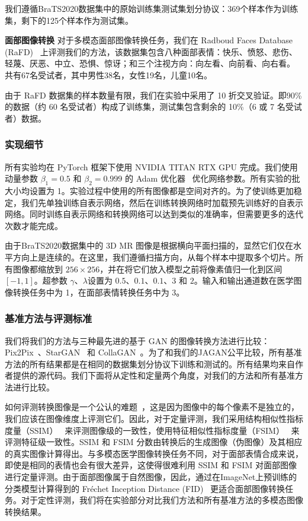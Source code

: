 我们遵循BraTS2020数据集中的原始训练集测试集划分协议：369个样本作为训练集，剩下的125个样本作为测试集。

\textbf{面部图像转换}
对于多模态面部图像转换任务，我们在 Radboud Faces Database (RaFD)~\cite{langner2010presentation} 上评测我们的方法，该数据集包含八种面部表情：快乐、愤怒、悲伤、轻蔑、厌恶、中立、恐惧、惊讶；和三个注视方向：向左看、向前看、向右看。 共有67名受试者，其中男性38名，女性19名，儿童10名。

由于 RaFD 数据集的样本数量有限，我们在实验中采用了 10 折交叉验证。即90\%的数据（约 60 名受试者）构成了训练集，测试集包含剩余的 10\%（6 或 7 名受试者）数据。

\subsubsection{实现细节}
所有实验均在 PyTorch 框架下使用 NVIDIA TITAN RTX GPU 完成。我们使用动量参数 $\beta_1 = 0.5$ 和 $\beta_2 = 0.999$ 的 Adam 优化器~\cite{kingma2014adam} 优化网络参数。所有实验的批大小均设置为 1。实验过程中使用的所有图像都是空间对齐的。为了使训练更加稳定，我们先单独训练自表示网络，然后在训练转换网络时加载预先训练好的自表示网络。同时训练自表示网络和转换网络可以达到类似的准确率，但需要更多的迭代次数才能完成。

由于BraTS2020数据集中的 3D MR 图像是根据横向平面扫描的，显然它们仅在水平方向上是连续的。在这里，我们遵循扫描方向，从每个样本中提取多个切片。所有图像都缩放到 $256\times256$，并在将它们放入模型之前将像素值归一化到区间 $[-1, 1]$。超参数 $\gamma$、$\lambda$设置为 $0.5$、$0.1$、$0.1$、$3$ 和 $2$。输入和输出通道数在医学图像转换任务中为 1，在面部表情转换任务中为 3。

\subsubsection{基准方法与评测标准}

我们将我们的方法与三种最先进的基于 GAN 的图像转换方法进行比较：Pix2Pix~\cite{pix2pix}、StarGAN~\cite{stargan} 和 CollaGAN~\cite{collagan}。为了和我们的JAGAN公平比较，所有基准方法的所有结果都是在相同的数据集划分协议下训练和测试的。所有结果均来自作者提供的源代码。我们下面将从定性和定量两个角度，对我们的方法和所有基准方法进行比较。

如何评测转换图像是一个公认的难题~\cite{salimans2016improved}，这是因为图像中的每个像素不是独立的，我们应该在图像维度上评测它们。因此，对于定量评测，我们采用结构相似性指标度量（SSIM）~\cite{ssim} 来评测图像级的一致性，使用特征相似性指标度量（FSIM）~\cite{fsim} 来评测特征级一致性。SSIM 和 FSIM 分数由转换后的生成图像（伪图像）及其相应的真实图像计算得出。与多模态医学图像转换任务不同，对于面部表情合成来说，即使是相同的表情也会有很大差异，这使得很难利用 SSIM 和 FSIM 对面部图像进行定量评测。由于面部图像属于自然图像，因此，通过在ImageNet上预训练的分类模型计算得到的 Fréchet Inception Distance (FID)~\cite{fid} 更适合面部图像转换任务。对于定性评测，我们将在实验部分对比我们方法和所有基准方法的多模态图像转换结果。

